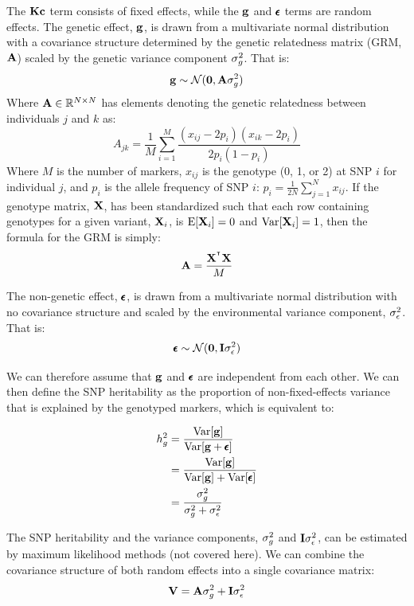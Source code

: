 \documentclass[12pt]{article}
\begin{document}
The $\mathbf{K} \mathbf{c}$ term consists of fixed effects, while the $\mathbf{g}$ and $\pmb{\epsilon}$ terms are random effects.
The genetic effect, $\mathbf{g}$, is drawn from a multivariate normal distribution with a covariance structure determined by the genetic relatedness matrix (GRM, $\mathbf{A}$) scaled by the genetic variance component $\sigma_g^2$. That is:
$$ \mathbf{g} \sim \mathcal{N} (\textbf{0}, \mathbf{A} \sigma_g^2)$$
Where $\mathbf{A} \in \mathbb{R}^{N \times N}$ has elements denoting the genetic relatedness between individuals $j$ and $k$ as:
$$ A_{jk} = \frac{1}{M} \sum_{i=1}^{M}
\frac{(x_{ij} - 2 p_i)(x_{ik} - 2 p_i)}
{2 p_i (1 - p_i)}
$$
Where $M$ is the number of markers, $x_{ij}$ is the genotype (0, 1, or 2) at SNP $i$ for individual $j$, and $p_i$ is the allele frequency of SNP $i$: $p_i = \frac{1}{2 N} \sum_{j=1}^{N} x_{ij}$.
If the genotype matrix, $\mathbf{X}$, has been standardized such that each row containing genotypes for a given variant, $\mathbf{X}_i$, is $\mathrm{E}[\mathbf{X}_i] = 0$ and $\mathrm{Var}[\mathbf{X}_i] = 1$, then the formula for the GRM is simply:
$$ \mathbf{A} = \frac{ \mathbf{X}^{^\intercal} \mathbf{X} }{M} $$

The non-genetic effect, $\pmb{\epsilon}$, is drawn from a multivariate normal distribution with no covariance structure and scaled by the environmental variance component, $\sigma_{\epsilon}^2$. That is:
$$ \pmb{\epsilon} \sim \mathcal{N} (\textbf{0}, \mathbf{I} \sigma_{\epsilon}^2) $$

We can therefore assume that $\mathbf{g}$ and $\pmb{\epsilon}$ are independent from each other.
We can then define the SNP heritability as the proportion of non-fixed-effects variance that is explained by the genotyped markers, which is equivalent to:

\begin{align*}
    h_g^2 &= \frac{\mathrm{Var}[\mathbf{g}]}{\mathrm{Var}[\mathbf{g} + \pmb{\epsilon}]} \\
    &= \frac{\mathrm{Var}[\mathbf{g}]}{\mathrm{Var}[\mathbf{g}] + \mathrm{Var}[\pmb{\epsilon}]} \\
    &= \frac{\sigma_g^2}{\sigma_g^2 + \sigma_{\epsilon}^2}
\end{align*}

The SNP heritability and the variance components, $\sigma_g^2$ and $\mathbf{I} \sigma_{\epsilon}^2$, can be estimated by maximum likelihood methods (not covered here).
We can combine the covariance structure of both random effects into a single covariance matrix:
$$ \mathbf{V} = \mathbf{A} \sigma_g^2 + \mathbf{I} \sigma_{\epsilon}^2 $$
\end{document}
